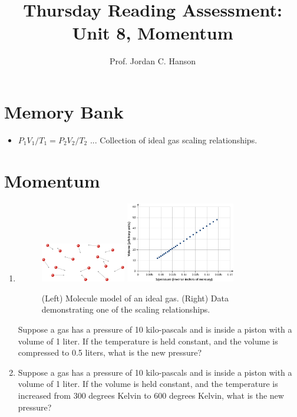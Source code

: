 \documentclass{article}
\begin{document}
\title{Thursday Reading Assessment: Unit 8, Momentum}
\author{Prof. Jordan C. Hanson}

\maketitle

\section{Memory Bank}

\begin{itemize}
\item $P_1 V_1 / T_1 = P_2 V_2 / T_2$ ... Collection of ideal gas scaling relationships.
\end{itemize}

\section{Momentum}

\begin{enumerate}
\item
\begin{figure}[ht]
\centering
\includegraphics[width=0.35\textwidth]{gas1.jpeg}
\includegraphics[width=0.45\textwidth]{gas2.jpeg}
\caption{\label{fig:collision} (Left) Molecule model of an ideal gas. (Right) Data demonstrating one of the scaling relationships.}
\end{figure}
Suppose a gas has a pressure of 10 kilo-pascals and is inside a piston with a volume of 1 liter.  If the temperature is held constant, and the volume is compressed to 0.5 liters, what is the new pressure? \\ \vspace{3cm}
\item Suppose a gas has a pressure of 10 kilo-pascals and is inside a piston with a volume of 1 liter.  If the volume is held constant, and the temperature is increased from 300 degrees Kelvin to 600 degrees Kelvin, what is the new pressure? \\ \vspace{2cm}
\end{enumerate}
\end{document}
